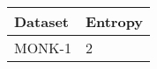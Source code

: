 \documentclass{article}
\begin{document}
\begin{tabular}{| l | p{5cm} |}
    \hline
    Dataset & Entropy \\
    \hline
    \hline
    MONK-1 & 2 \\
    \hline
\end{tabular}
\end{document}
